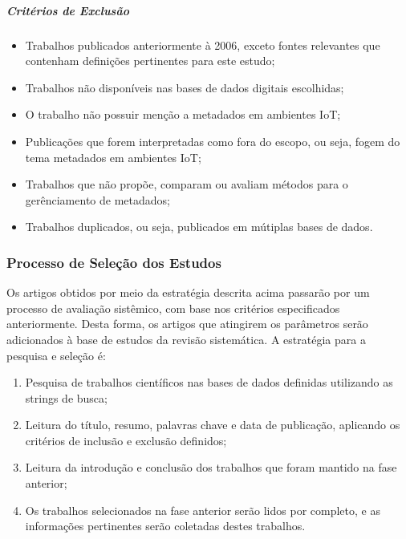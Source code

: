 \subparagraph{Critérios de Exclusão}
\begin{itemize}
  \item Trabalhos publicados anteriormente à 2006, exceto fontes relevantes que contenham definições pertinentes para este estudo;
  \item Trabalhos não disponíveis nas bases de dados digitais escolhidas;
  \item O trabalho não possuir menção a metadados em ambientes \acrlong{IoT};
  \item Publicações que forem interpretadas como fora do escopo, ou seja, fogem do tema metadados em ambientes \acrshort{IoT};
  \item Trabalhos que não propõe, comparam ou avaliam métodos para o gerênciamento de metadados;
  \item Trabalhos duplicados, ou seja, publicados em mútiplas bases de dados.
\end{itemize}

\subsubsection{Processo de Seleção dos Estudos}
Os artigos obtidos por meio da estratégia descrita acima passarão por um processo de avaliação sistêmico, com base nos critérios especificados anteriormente.
Desta forma, os artigos que atingirem os parâmetros serão adicionados à base de estudos da revisão sistemática. A estratégia para a pesquisa e seleção é:
\begin{enumerate}
  \item Pesquisa de trabalhos científicos nas bases de dados definidas utilizando as strings de busca;
  \item Leitura do título, resumo, palavras chave e data de publicação, aplicando os critérios de inclusão e exclusão definidos;
  \item Leitura da introdução e conclusão dos trabalhos que foram mantido na fase anterior;
  \item Os trabalhos selecionados na fase anterior serão lidos por completo, e as informações pertinentes serão coletadas destes trabalhos.
\end{enumerate}





